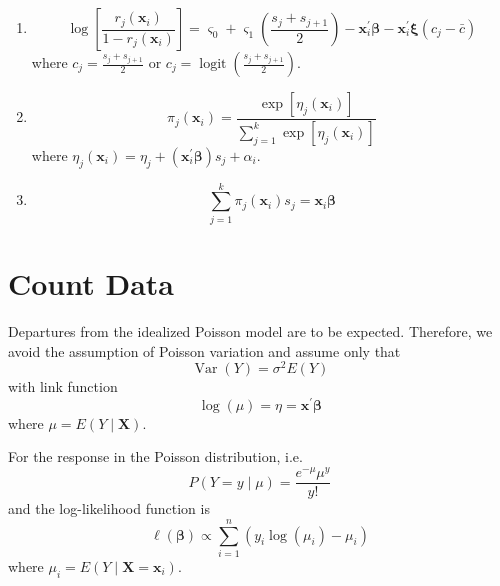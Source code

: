 \begin{enumerate}
    \item \begin{equation}
              \log\left[\frac{r_{j}\left(\mathbf{x}_{i}\right)}{1-r_{j}\left(\mathbf{x}_{i}\right)}\right]=\varsigma_{0}+\varsigma_{1}\left(\frac{s_{j}+s_{j+1}}{2}\right)-\mathbf{x}_{i}^{\prime}\boldsymbol{\beta}-\mathbf{x}_{i}^{\prime}\boldsymbol{\xi}\left(c_{j}-\bar{c}\right)
          \end{equation}
          where $c_{j}=\frac{s_{j}+s_{j+1}}{2}$ or $c_{j}=\operatorname{logit}\left(\frac{s_{j}+s_{j+1}}{2}\right)$.
    \item \begin{equation}
              \pi_{j}\left(\mathbf{x}_{i}\right)=\frac{\exp \left[\eta_{j}\left(\mathbf{x}_{i}\right)\right]}{\sum_{j=1}^{k} \exp \left[\eta_{j}\left(\mathbf{x}_{i}\right)\right]}
          \end{equation}
          where $\eta_{j}\left(\mathbf{x}_{i}\right)=\eta_{j}+\left(\mathbf{x}_{i}^{\prime}\boldsymbol{\beta}\right)s_{j}+\alpha_{i}$.
    \item \begin{equation}
              \sum_{j=1}^{k}\pi_{j}\left(\mathbf{x}_{i}\right)s_{j}=\mathbf{x}_{i}\boldsymbol{\beta}
          \end{equation}
\end{enumerate}

\section{Count Data}

Departures from the idealized Poisson model are to be expected. Therefore, we avoid the assumption of Poisson variation and assume only that
\begin{equation}
    \operatorname{Var}\left(Y\right)=\sigma^{2}E\left(Y\right)
\end{equation}
with link function
\begin{equation}
    \log\left(\mu\right)=\eta=\mathbf{x}^{\prime}\boldsymbol{\beta}
\end{equation}
where $\mu=E\left(Y\mid\mathbf{X}\right)$.

For the response in the Poisson distribution, i.e.
\begin{equation*}
    P(Y=y\mid\mu)=\frac{e^{-\mu}\mu^{y}}{y!}
\end{equation*}
and the log-likelihood function is
\begin{equation}
    \ell\left(\boldsymbol{\beta}\right)\propto\sum_{i=1}^{n}\left(y_{i} \log\left(\mu_{i}\right)-\mu_{i}\right)
\end{equation}
where $\mu_{i}=E\left(Y\mid\mathbf{X}=\mathbf{x}_{i}\right)$.
